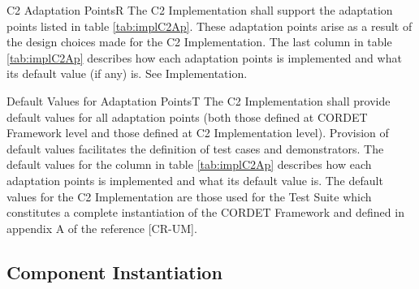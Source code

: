 \documentclass{pnp_article}
\begin{document}
\begin{fwReq}{C2 Adaptation Points}{R}
{The C2 Implementation shall support the adaptation points listed in table \ref{tab:implC2Ap}.}
{These adaptation points arise as a result of the design choices made for the C2 Implementation.}
{The last column in table \ref{tab:implC2Ap} describes how each adaptation points is implemented and what its default value (if any) is. } 
{See Implementation.}
\end{fwReq}


\begin{fwReq}{Default Values for Adaptation Points}{T}
{The C2 Implementation shall provide default values for all adaptation points (both those defined at CORDET Framework level and those defined at C2 Implementation level).}
{Provision of default values facilitates the definition of test cases and demonstrators.}
{The default values for the  column in table \ref{tab:implC2Ap} describes how each adaptation points is implemented and what its default value is. } 
{The default values for the C2 Implementation are those used for the Test Suite which constitutes a complete instantiation of the CORDET Framework and defined in appendix A of the reference [CR-UM].}
\end{fwReq}


\subsection{Component Instantiation}
\end{document}
